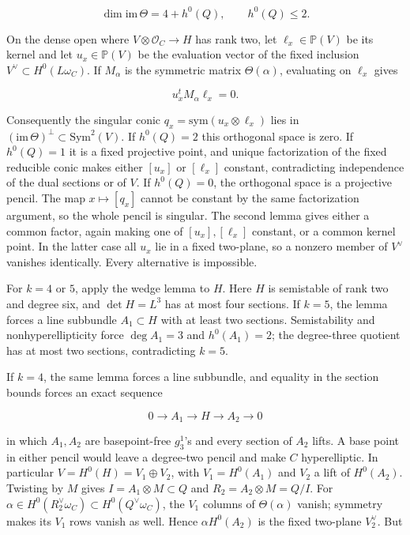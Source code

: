 \documentclass[11pt]{article}
\theoremstyle{definition}
\begin{document}
\[\dim\mathrm{im}\,\Theta=4+h^0(Q),
\qquad h^0(Q)\le2.\]

On the dense open where \(V\otimes\mathcal O_C\to H\) has rank two, let
\(\ell_x\in\mathbb P(V)\) be its kernel and let \(u_x\in\mathbb P(V)\)
be the evaluation vector of the fixed inclusion
\(V^\vee\subset H^0(L\omega_C)\). If \(M_\alpha\) is the symmetric
matrix \(\Theta(\alpha)\), evaluating on \(\ell_x\) gives

\[u_x^tM_\alpha\ell_x=0.\]

Consequently the singular conic \(q_x=\mathrm{sym}(u_x\otimes\ell_x)\)
lies in \((\mathrm{im}\,\Theta)^\perp\subset\mathrm{Sym}^2(V)\). If
\(h^0(Q)=2\) this orthogonal space is zero. If \(h^0(Q)=1\) it is a
fixed projective point, and unique factorization of the fixed reducible
conic makes either \([u_x]\) or \([\ell_x]\) constant, contradicting
independence of the dual sections or of \(V\). If \(h^0(Q)=0\), the
orthogonal space is a projective pencil. The map \(x\mapsto[q_x]\)
cannot be constant by the same factorization argument, so the whole
pencil is singular. The second lemma gives either a common factor, again
making one of \([u_x],[\ell_x]\) constant, or a common kernel point. In
the latter case all \(u_x\) lie in a fixed two-plane, so a nonzero
member of \(V^\vee\) vanishes identically. Every alternative is
impossible.

For \(k=4\) or \(5\), apply the wedge lemma to \(H\). Here \(H\) is
semistable of rank two and degree six, and \(\det H=L^3\) has at most
four sections. If \(k=5\), the lemma forces a line subbundle
\(A_1\subset H\) with at least two sections. Semistability and
nonhyperellipticity force \(\deg A_1=3\) and \(h^0(A_1)=2\); the
degree-three quotient has at most two sections, contradicting \(k=5\).

If \(k=4\), the same lemma forces a line subbundle, and equality in the
section bounds forces an exact sequence

\[0\longrightarrow A_1\longrightarrow H\longrightarrow A_2
\longrightarrow0\]

in which \(A_1,A_2\) are basepoint-free \(g^1_3\)'s and
every section of \(A_2\) lifts. A base point in either pencil would
leave a degree-two pencil and make \(C\) hyperelliptic. In particular
\(V=H^0(H)=V_1\oplus V_2\), with \(V_1=H^0(A_1)\) and \(V_2\) a lift of
\(H^0(A_2)\). Twisting by \(M\) gives \(I=A_1\otimes M\subset Q\) and
\(R_2=A_2\otimes M=Q/I\). For
\(\alpha\in H^0(R_2^\vee\omega_C)\subset H^0(Q^\vee\omega_C)\), the
\(V_1\) columns of \(\Theta(\alpha)\) vanish; symmetry makes its \(V_1\)
rows vanish as well. Hence \(\alpha H^0(A_2)\) is the fixed two-plane
\(V_2^\vee\). But
\end{document}
